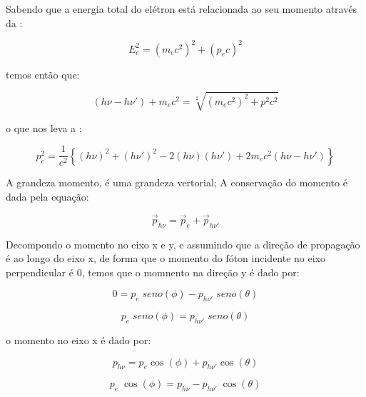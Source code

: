 \documentclass[11pt,a4paper]{article}
\begin{document}
            
    \noindent Sabendo que a energia total do elétron está relacionada ao seu momento através da :

                \begin{equation}
                    E_e^2 = (m_ec^2)^2 + (p_ec)^2
                \end{equation}

    \noindent temos então que:

                \begin{equation}
                    (h\nu - h\nu') + m_ec^2 = \sqrt[2]{(m_ec^2)^2 + p^2 c^2}
                \end{equation}

    \noindent o que nos leva a :

                \begin{equation}
                    p_e^2 = \frac{1}{c^2} \left\{ (h\nu)^2 + (h\nu')^2 - 2 (h\nu)(h\nu') + 2m_ec^2(h\nu - h\nu')\right\}
                    \label{eq:momentoConserEner}
                \end{equation}

    \noindent A grandeza momento, é uma grandeza vertorial; A conservação do momento é dada pela equação:

                \begin{equation}
                    \vec{p}_{h\nu} = \vec{p}_e + \vec{p}_{h\nu'}
                 \end{equation}

    \noindent Decompondo o momento no eixo x e y, e assumindo que a direção de propagação é ao longo do eixo x, de forma que o momento do fóton incidente no eixo perpendicular é 0, temos que o momnento na direção y é dado por:

                 $$0 = p_e \; seno(\phi) - p_{h\nu'} \; seno(\theta)$$

                 \begin{equation}
                    p_e \; seno(\phi) = p_{h\nu'} \; seno(\theta)
                 \end{equation}

    \noindent o momento no eixo x é dado por:

                 $$p_{h\nu} = p_e \cos(\phi) + p_{h\nu'} \cos(\theta)$$

                 \begin{equation}
                    p_e \; \cos(\phi) = p_{h\nu} - p_{h\nu'} \; \cos(\theta)
                 \end{equation}
\end{document}
